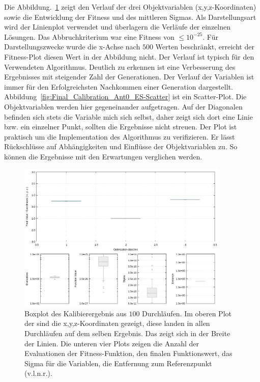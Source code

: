 Die Abbildung.~\ref{fig:Final_Calibration_Ant0_ES-boxes} zeigt den Verlauf der drei Objektvariablen (x,y,z-Koordinaten) sowie die Entwicklung der Fitness und des mittleren Sigmas. Als Darstellungsart wird der Linienplot verwendet und überlagern die Verläufe der einzelnen Lösungen. Das Abbruchkriterium war eine Fitness von $\leq 10^{-25}$. Für Darstellungszwecke wurde die x-Achse nach $500$ Werten beschränkt, erreicht der Fitness-Plot diesen Wert in der Abbildung nicht. Der Verlauf ist typisch für den Verwendeten Algorithmus. Deutlich zu erkennen ist eine Verbesserung des Ergebnisses mit steigender Zahl der Generationen. Der Verlauf der Variablen ist immer für den Erfolgreichsten Nachkommen einer Generation dargestellt.\\
%

Abbildung~\ref{fig:Final_Calibration_Ant0_ES-Scatter} ist ein Scatter-Plot. Die Objektvariablen werden hier gegeneinander aufgetragen. Auf der Diagonalen befinden sich stets die Variable mich sich selbst, daher zeigt sich dort eine Linie bzw. ein einzelner Punkt, sollten die Ergebnisse nicht streuen. Der Plot ist praktisch um die Implementation des Algorithmus zu verifizieren. Er lässt Rückschlüsse auf Abhängigkeiten und Einflüsse der Objektvariablen zu. So können die Ergebnisse mit den Erwartungen verglichen werden.\\
%
%
\begin{figure}[!ht]
  \begin{center}
    \includegraphics[width=0.9\textwidth]{img/calibration/calibration_ant0-boxes.png}
  \end{center}
  \caption {Boxplot des Kalibierergebnis aus $100$ Durchläufen. Im oberen Plot der sind die x,y,z-Koordinaten gezeigt, diese landen in allen Durchläufen auf dem selben Ergebnis. Das zeigt sich in der Breite der Linien. Die unteren vier Plots zeigen die Anzahl der Evaluationen der Fitness-Funktion, den finalen Funktionswert, das Sigma für die Variablen, die Entfernung zum Referenzpunkt (v.l.n.r.).}
  \label{fig:Final_Calibration_Ant0_ES-boxes}
%
\end{figure}
